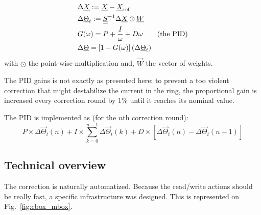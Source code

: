 
\begin{align}
   & \Delta \underline{X} := \underline{X}-\underline{X}_\text{ref} \nonumber \\
   & \Delta \underline{\Theta}_t :=  \underline{\underline{S}}^{-1} \Delta \underline{X} \odot \underline{W} \nonumber\\
   & G(\omega) = P + \frac{I}{\omega} + D \omega \qquad \text{(the PID)}\nonumber \\
   & \Delta \underline{\Theta} = \left[1-G(\omega)\right] (\Delta \underline{\Theta}_t)
\end{align}
with $\odot$ the point-wise multiplication and, $\vec{W}$ the vector of weights.

\remark The PID gains is not exactly as presented here: to prevent a too violent correction that might destabilize the current in the ring, the proportional gain is increased every correction round by 1\% until it reaches its nominal value.

\remark The PID is implemented as (for the $n$th correction round): 
\begin{equation*}
    P \times \Delta \vec{\Theta}_t(n) + I \times \sum\limits_{k=0}^{n-1}\Delta \vec{\Theta}_t(k) + D \times \left[\Delta \vec{\Theta}_t(n) - \Delta \vec{\Theta}_t(n-1)\right]
\end{equation*}

\subsection{Technical overview}

The correction is naturally automatized. Because the read/write actions should be really fast, a specific infrastructure was designed. This is represented on Fig.~\ref{fig:cbox_mbox}. 

